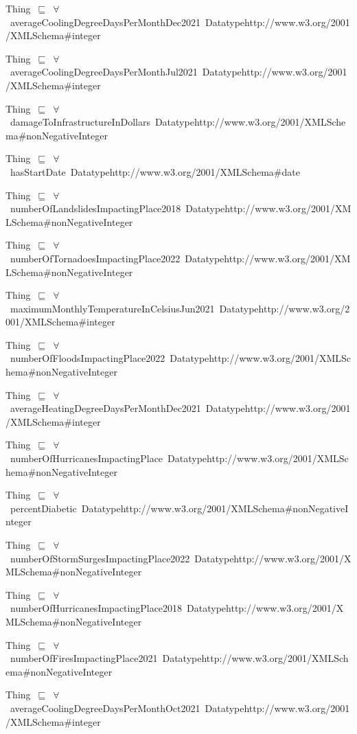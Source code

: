 \documentclass{article}
\begin{document}
Thing~\ensuremath{\sqsubseteq}~\ensuremath{\forall}~averageCoolingDegreeDaysPerMonthDec2021~Datatypehttp://www.w3.org/2001/XMLSchema#integer~

Thing~\ensuremath{\sqsubseteq}~\ensuremath{\forall}~averageCoolingDegreeDaysPerMonthJul2021~Datatypehttp://www.w3.org/2001/XMLSchema#integer~

Thing~\ensuremath{\sqsubseteq}~\ensuremath{\forall}~damageToInfrastructureInDollars~Datatypehttp://www.w3.org/2001/XMLSchema#nonNegativeInteger~

Thing~\ensuremath{\sqsubseteq}~\ensuremath{\forall}~hasStartDate~Datatypehttp://www.w3.org/2001/XMLSchema#date~

Thing~\ensuremath{\sqsubseteq}~\ensuremath{\forall}~numberOfLandslidesImpactingPlace2018~Datatypehttp://www.w3.org/2001/XMLSchema#nonNegativeInteger~

Thing~\ensuremath{\sqsubseteq}~\ensuremath{\forall}~numberOfTornadoesImpactingPlace2022~Datatypehttp://www.w3.org/2001/XMLSchema#nonNegativeInteger~

Thing~\ensuremath{\sqsubseteq}~\ensuremath{\forall}~maximumMonthlyTemperatureInCelsiusJun2021~Datatypehttp://www.w3.org/2001/XMLSchema#integer~

Thing~\ensuremath{\sqsubseteq}~\ensuremath{\forall}~numberOfFloodsImpactingPlace2022~Datatypehttp://www.w3.org/2001/XMLSchema#nonNegativeInteger~

Thing~\ensuremath{\sqsubseteq}~\ensuremath{\forall}~averageHeatingDegreeDaysPerMonthDec2021~Datatypehttp://www.w3.org/2001/XMLSchema#integer~

Thing~\ensuremath{\sqsubseteq}~\ensuremath{\forall}~numberOfHurricanesImpactingPlace~Datatypehttp://www.w3.org/2001/XMLSchema#nonNegativeInteger~

Thing~\ensuremath{\sqsubseteq}~\ensuremath{\forall}~percentDiabetic~Datatypehttp://www.w3.org/2001/XMLSchema#nonNegativeInteger~

Thing~\ensuremath{\sqsubseteq}~\ensuremath{\forall}~numberOfStormSurgesImpactingPlace2022~Datatypehttp://www.w3.org/2001/XMLSchema#nonNegativeInteger~

Thing~\ensuremath{\sqsubseteq}~\ensuremath{\forall}~numberOfHurricanesImpactingPlace2018~Datatypehttp://www.w3.org/2001/XMLSchema#nonNegativeInteger~

Thing~\ensuremath{\sqsubseteq}~\ensuremath{\forall}~numberOfFiresImpactingPlace2021~Datatypehttp://www.w3.org/2001/XMLSchema#nonNegativeInteger~

Thing~\ensuremath{\sqsubseteq}~\ensuremath{\forall}~averageCoolingDegreeDaysPerMonthOct2021~Datatypehttp://www.w3.org/2001/XMLSchema#integer~
\end{document}
